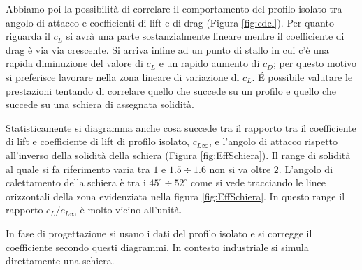Abbiamo poi la possibilità di correlare il comportamento del profilo isolato tra angolo di attacco e coefficienti di lift e di drag (Figura \ref{fig:cdcl}). Per quanto riguarda il $c_L$ si avrà una parte sostanzialmente lineare mentre il coefficiente di drag è via via crescente. Si arriva infine ad un punto di stallo in cui c'è una rapida diminuzione del valore di $c_L$ e un rapido aumento di $c_D$; per questo motivo si preferisce lavorare nella zona lineare di variazione di $c_L$. \'E possibile valutare le prestazioni tentando di correlare quello che succede su un profilo e quello che succede su una schiera di assegnata solidità.

Statisticamente si diagramma anche cosa succede tra il rapporto tra il coefficiente di lift e coefficiente di lift di profilo isolato, $c_{L \infty}$, e l'angolo di attacco rispetto all'inverso della solidità della schiera (Figura \ref{fig:EffSchiera}). 
Il range di solidità al quale si fa riferimento varia tra $1$ e $ 1.5 \div 1.6$ non si va oltre $2$. L'angolo di calettamento della schiera è tra i $45^{\circ} \div 52^{\circ}$ come si vede tracciando le linee orizzontali della zona evidenziata nella figura \ref{fig:EffSchiera}. In questo range il rapporto $c_L / c_{L \infty}$ è molto vicino all'unità. 

In fase di progettazione si usano i dati del profilo isolato e si corregge il coefficiente secondo questi diagrammi. In contesto industriale si simula direttamente una schiera. 


